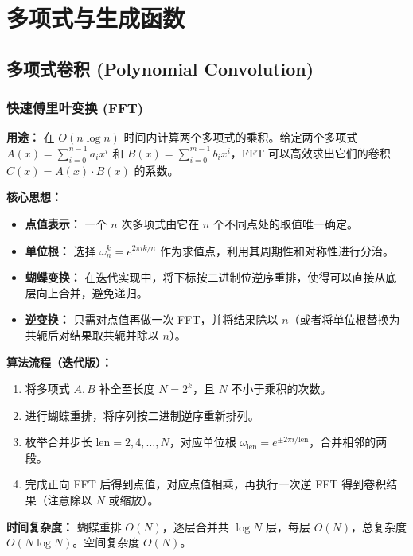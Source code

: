 \section{多项式与生成函数}

\subsection{多项式卷积 (Polynomial Convolution)}

\subsubsection{快速傅里叶变换 (FFT)}

\textbf{用途：}
在 $O(n\log n)$ 时间内计算两个多项式的乘积。给定两个多项式 $A(x)=\sum_{i=0}^{n-1}a_ix^i$ 和 $B(x)=\sum_{i=0}^{m-1}b_ix^i$，FFT 可以高效求出它们的卷积 $C(x)=A(x)\cdot B(x)$ 的系数。

\textbf{核心思想：}
\begin{itemize}
    \item \textbf{点值表示：} 一个 $n$ 次多项式由它在 $n$ 个不同点处的取值唯一确定。
    \item \textbf{单位根：} 选择 $\omega_n^k = e^{2\pi i k/n}$ 作为求值点，利用其周期性和对称性进行分治。
    \item \textbf{蝴蝶变换：} 在迭代实现中，将下标按二进制位逆序重排，使得可以直接从底层向上合并，避免递归。
    \item \textbf{逆变换：} 只需对点值再做一次 FFT，并将结果除以 $n$（或者将单位根替换为共轭后对结果取共轭并除以 $n$）。
\end{itemize}

\textbf{算法流程（迭代版）：}
\begin{enumerate}
    \item 将多项式 $A,B$ 补全至长度 $N=2^k$，且 $N$ 不小于乘积的次数。
    \item 进行蝴蝶重排，将序列按二进制逆序重新排列。
    \item 枚举合并步长 $\text{len}=2,4,\dots,N$，对应单位根 $\omega_{\text{len}}=e^{\pm 2\pi i/\text{len}}$，合并相邻的两段。
    \item 完成正向 FFT 后得到点值，对应点值相乘，再执行一次逆 FFT 得到卷积结果（注意除以 $N$ 或缩放）。
\end{enumerate}

\textbf{时间复杂度：} 蝴蝶重排 $O(N)$，逐层合并共 $\log N$ 层，每层 $O(N)$，总复杂度 $O(N\log N)$。空间复杂度 $O(N)$。



